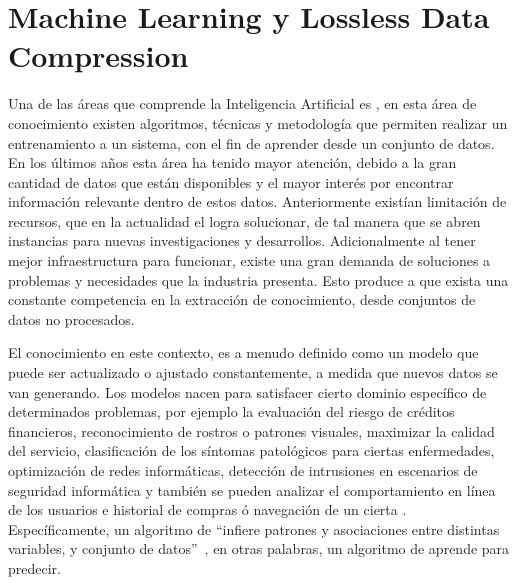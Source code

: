 
\chapter[Machine Learning y Lossless Data Compression]{Machine Learning y Lossless Data Compression}\label{ch:Compresion-Machine-Learning}


Una de las áreas que comprende la Inteligencia Artificial es \machinelearning, en esta área de conocimiento existen algoritmos, técnicas y metodología que permiten realizar un entrenamiento a un sistema, con el fin de aprender desde un conjunto de datos. En los últimos años esta área ha tenido mayor atención, debido a la gran cantidad de datos que están disponibles y el mayor interés por encontrar información relevante dentro de estos datos. Anteriormente existían limitación de recursos, que en la actualidad el \cloudcomputing logra solucionar, de tal manera que se abren instancias para nuevas investigaciones y desarrollos. Adicionalmente al tener mejor infraestructura para funcionar, existe una gran demanda de soluciones a problemas y necesidades que la industria presenta. Esto produce  a que exista una constante competencia en la extracción de conocimiento, desde conjuntos de datos no procesados.

El conocimiento en este contexto, es a menudo definido como un modelo que puede ser actualizado o ajustado constantemente, a medida que nuevos datos se van generando. Los modelos nacen para satisfacer cierto dominio específico de determinados problemas, por ejemplo la evaluación del riesgo de créditos financieros, reconocimiento de rostros o patrones visuales, maximizar la calidad del servicio, clasificación de los síntomas patológicos para ciertas enfermedades, optimización de redes informáticas, detección de intrusiones en escenarios de seguridad informática y también se pueden analizar el comportamiento en línea de los usuarios e historial de compras ó navegación  de un cierta \web. Específicamente, un algoritmo de \machinelearning ``infiere patrones y asociaciones entre distintas variables, y conjunto de datos''~\cite[capítulo 8]{guller2015big}, en otras palabras, un algoritmo de \machinelearning aprende para predecir. 


